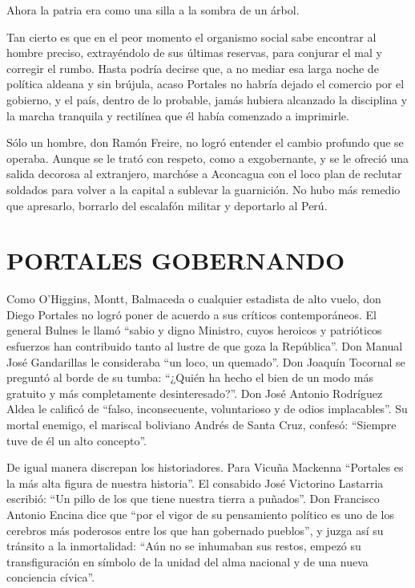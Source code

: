 \documentclass[10pt,twoside,openright]{memoir}
\begin{document}
Ahora la patria era como una silla a la sombra de un árbol.

Tan cierto es que en el peor momento el organismo social sabe encontrar
al hombre preciso, extrayéndolo de sus últimas reservas, para conjurar
el mal y corregir el rumbo. Hasta podría decirse que, a no mediar esa
larga noche de política aldeana y sin brújula, acaso Portales no habría
dejado el comercio por el gobierno, y el país, dentro de lo probable,
jamás hubiera alcanzado la disciplina y la marcha tranquila y rectilínea
que él había comenzado a imprimirle.

Sólo un hombre, don Ramón Freire, no logró entender el cambio profundo
que se operaba. Aunque se le trató
con respeto, como a exgobernante, y se le ofreció una salida decorosa al
extranjero, marchóse a Aconcagua con el loco plan de reclutar soldados
para volver a la capital a sublevar la guarnición. No hubo más remedio
que apresarlo, borrarlo del escalafón militar y deportarlo al Perú.

\chapter{PORTALES GOBERNANDO}

Como O'Higgins, Montt, Balmaceda o cualquier estadista de alto vuelo, don
Diego Portales no logró poner de acuerdo a sus críticos contemporáneos.
El general Bulnes le llamó ``sabio y digno Ministro, cuyos heroicos y
patrióticos esfuerzos han contribuido tanto al lustre de que goza la
República''. Don Manual José Gandarillas le consideraba ``un loco, un
quemado''. Don Joaquín Tocornal se preguntó al borde de su tumba: ``¿Quién
ha hecho el bien de un modo más gratuito y más completamente
desinteresado?''. Don José Antonio Rodríguez Aldea le calificó de ``falso,
inconsecuente, voluntarioso y de odios implacables''. Su mortal enemigo,
el mariscal boliviano Andrés de Santa Cruz, confesó: ``Siempre tuve de él
un alto concepto''. 

De igual manera discrepan los historiadores. Para Vicuña Mackenna
``Portales es la más alta figura de
nuestra historia''. El consabido José Victorino Lastarria escribió: ``Un
pillo de los que tiene nuestra tierra a puñados''. Don Francisco Antonio Encina
dice que ``por el vigor de su pensamiento político es uno de los cerebros más
poderosos entre los que han gobernado pueblos'', y juzga así su tránsito a la
inmortalidad: ``Aún no se inhumaban sus restos, empezó su transfiguración en símbolo 
de la unidad del  alma nacional y de una nueva conciencia cívica''.
\end{document}
